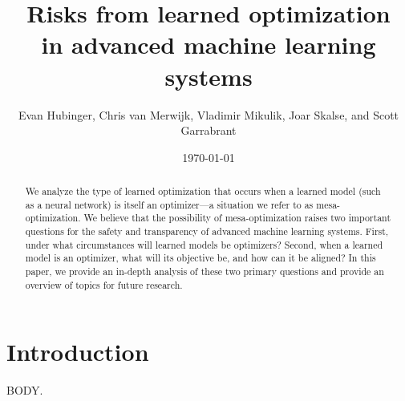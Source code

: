 \documentclass[
    12pt,
    letterpaper,
    aps,
    prd,
    longbibliography,
    nofootinbib,
    raggedbottom,
    amsmath,
    amssymb,
    amsfonts,
    nobibnotes,
]{revtex4-2}
\begin{document}
\title{Risks from learned optimization \\ in advanced machine learning systems}
\author{Evan Hubinger, Chris van Merwijk, Vladimir Mikulik, Joar Skalse, and Scott Garrabrant}
\date{\today}

\begin{abstract}
We analyze the type of learned optimization that occurs when a learned model (such as a neural network) is itself an optimizer—a situation we refer to as mesa-optimization. We believe that the possibility of mesa-optimization raises two important questions for the safety and transparency of advanced machine learning systems. First, under what circumstances will learned models be optimizers? Second, when a learned model is an optimizer, what will its objective be, and how can it be aligned? In this paper, we provide an in-depth analysis of these two primary questions and provide an overview of topics for future research.
\end{abstract}

\maketitle

\newpage
\tableofcontents
\newpage

\section{Introduction}

BODY.

\nocite{leike}
\nocite{*}


\end{document}
